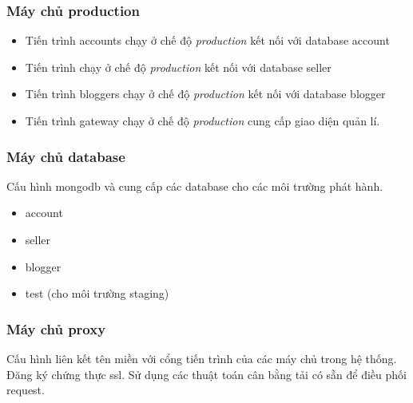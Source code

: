 \subsubsection{Máy chủ \gls{production}}
\begin{itemize}
	\item Tiến trình accounts chạy ở chế độ \emph{production} kết nối với database account
	\item Tiến trình  chạy ở chế độ \emph{production} kết nối với database seller
	\item Tiến trình bloggers chạy ở chế độ \emph{production} kết nối với database blogger
	\item Tiến trình gateway chạy ở chế độ \emph{production} cung cấp giao diện quản lí.
\end{itemize}

\subsubsection{Máy chủ database}
Cấu hình mongodb và cung cấp các database cho các môi trường phát hành.
\begin{itemize}
	\item account
	\item seller
	\item blogger
	\item test (cho môi trường \gls{staging})
\end{itemize}
\subsubsection{Máy chủ proxy}
Cấu hình liên kết tên miền với cổng tiến trình của các máy chủ trong hệ thống. Đăng ký chứng thực \acrshort{ssl}. Sử dụng các thuật toán cân bằng tải có sẵn để điều phối \gls{request}.


